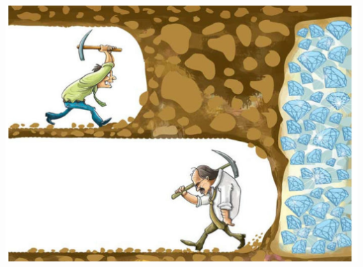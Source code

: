 \documentclass[a4paper]{exam}
\begin{document}
\begin{questions}
\begin{parts}
    \end{parts}

    \begin{center}
        \includegraphics[scale = 0.25]{keep_gambling.png}
    \end{center}
    
  
  
\end{questions}
\end{document}

